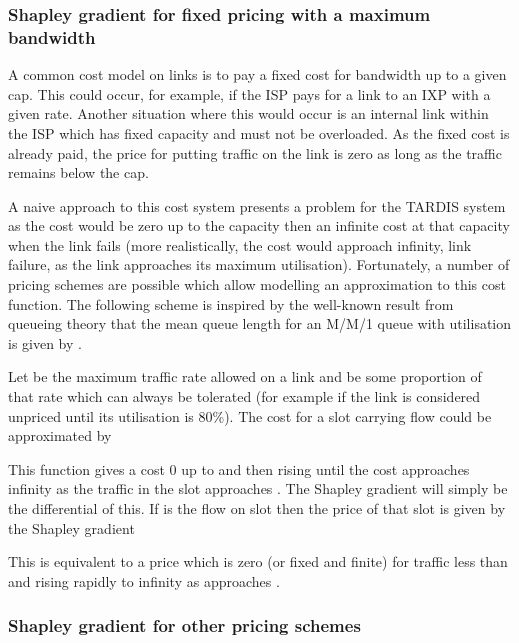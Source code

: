 \subsubsection{Shapley gradient for fixed pricing with a maximum bandwidth}
\label{sec:fixed_price}

A common cost model on links is to pay a fixed cost for bandwidth
up to a given cap.  This could occur, for example, if the ISP pays
for a link to an IXP with a given rate.  Another situation where this
would occur is an internal link within the ISP which has fixed capacity
and must not be overloaded.  As the fixed cost is already paid, the
price for putting traffic on the link is zero as long as the traffic
remains below the cap.

A naive approach to this cost system presents a problem for the
TARDIS system as the cost would be zero up to the capacity
then an infinite cost at that capacity when
the link fails (more realistically, the cost would approach
infinity, link failure, as the link approaches its maximum utilisation). 
Fortunately, a number of 
pricing schemes are possible which allow modelling an approximation
to this cost function.  The following scheme is inspired by the
well-known result from queueing theory that the mean queue length
for an M/M/1 queue with utilisation  is given by
.

Let  be the maximum traffic rate allowed on a link and 
 be some
proportion of that rate which can always be tolerated (for example
if  the link is considered unpriced until
its utilisation is 80\%).  The cost for
a slot  carrying flow  could be approximated by

This function gives a cost 0 up to  and then rising
until the cost approaches infinity as the traffic in the
slot approaches .
The Shapley gradient will simply be the differential of this.
If  is the flow on slot  then the price of that slot
is given by the Shapley gradient

This is equivalent to a price which is zero (or fixed and finite)
for traffic less than  and rising rapidly to infinity as
 approaches .

\subsubsection{Shapley gradient for other pricing schemes}
\label{sec:other_price}


